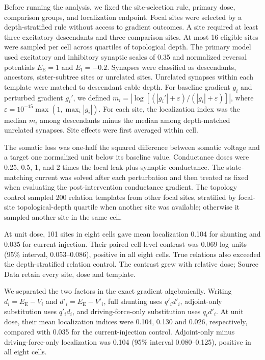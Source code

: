 Before running the analysis, we fixed the site-selection rule, primary dose,
comparison groups, and localization endpoint. Focal sites were selected by a
depth-stratified rule without access to gradient outcomes. A site required at
least three excitatory descendants and
three comparison sites. At most 16 eligible sites were sampled per cell across
quartiles of topological depth. The primary model used excitatory and
inhibitory synaptic scales of 0.35 and normalized reversal potentials
$E_{\mathrm E}=1$ and $E_{\mathrm I}=-0.2$. Synapses were classified as descendants, ancestors,
sister-subtree sites or unrelated sites. Unrelated synapses within each
template were matched to descendant cable depth. For baseline gradient $g_i$
and perturbed gradient $g_i'$, we defined
$m_i=\left|\log[(|g_i'|+\varepsilon)/(|g_i|+\varepsilon)]\right|$, where
$\varepsilon=10^{-15}\max(1,\max_i|g_i|)$. For each site, the localization
index was the median $m_i$ among descendants minus the median among
depth-matched unrelated synapses. Site effects were first averaged within cell.

The somatic loss was one-half the squared difference between somatic voltage
and a target one normalized unit below its baseline value. Conductance doses
were 0.25, 0.5, 1, and 2 times the local leak-plus-synaptic conductance. The
state-matching current was solved after each perturbation and then treated as
fixed when evaluating the post-intervention conductance gradient. The topology
control sampled 200 relation templates from other focal sites, stratified by
focal-site topological-depth quartile when another site was available;
otherwise it sampled another site in the same cell.

At unit dose, 101 sites in eight cells gave mean localization 0.104 for shunting and 0.035 for current injection. Their paired cell-level contrast was 0.069 log units (95\% interval, 0.053--0.086), positive in all eight cells. True relations also exceeded the depth-stratified relation control. The contrast grew with relative dose; Source Data retain every site, dose and template.

We separated the two factors in the exact gradient algebraically. Writing
$d_i=E_{\mathrm E}-V_i$ and $d'_i=E_{\mathrm E}-V'_i$, full shunting uses $q'_id'_i$,
adjoint-only substitution uses $q'_id_i$, and driving-force-only substitution
uses $q_id'_i$. At unit dose, their mean localization indices were 0.104,
0.130 and 0.026, respectively, compared with 0.035 for the current-injection
control. Adjoint-only minus driving-force-only localization was 0.104 (95\%
interval 0.080--0.125), positive in all eight cells.

